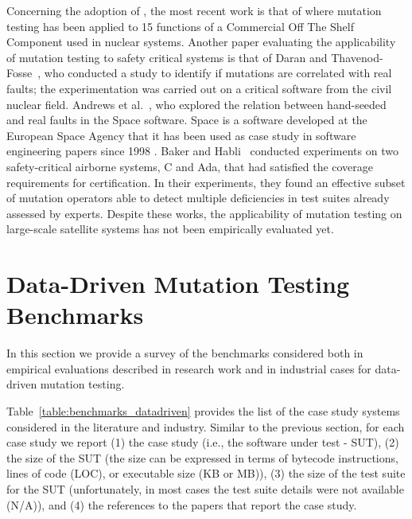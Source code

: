 Concerning the adoption of , the most recent work is that of \cite{delgado2018evaluation} where mutation testing has been applied to 15 functions of a Commercial Off The Shelf Component used in nuclear systems. 
Another paper evaluating the applicability of mutation testing to safety critical systems is that of Daran and Thavenod-Fosse~\cite{daran1996software}, who conducted a study to identify if mutations are correlated with real faults; the experimentation was carried out on a critical software from the civil nuclear field. Andrews et al.~\cite{andrews2005mutation}, who explored the relation between hand-seeded and real faults in the Space software. Space is a software developed at the European Space Agency that it has been used as case study in software engineering papers since 1998 \cite{frankl1998further}.
Baker and Habli~\cite{baker2012empirical} conducted experiments on two safety-critical airborne systems, C and Ada, that had satisfied the coverage requirements for certification. In their experiments, they found an effective subset of mutation operators able to detect multiple deficiencies in test suites already assessed by experts. 
Despite these works, the applicability of mutation testing on large-scale satellite systems has not been empirically evaluated yet.





\clearpage

\section{Data-Driven Mutation Testing Benchmarks}
\label{section:industry:data}

In this section we provide a survey of the benchmarks considered both in empirical evaluations described in research work and in industrial cases for data-driven mutation testing.

Table~\ref{table:benchmarks_datadriven} provides the list of the case study systems considered in the literature and industry. Similar to the previous section, for each case study we report (1) the case study (i.e., the software under test - SUT), (2) the size of the SUT (the size can be expressed in terms of bytecode instructions, lines of code (LOC), or executable size (KB or MB)), (3) the size of the test suite for the SUT (unfortunately, in most cases the test suite details were not available (N/A)), and (4) the references to the papers that report the case study.

